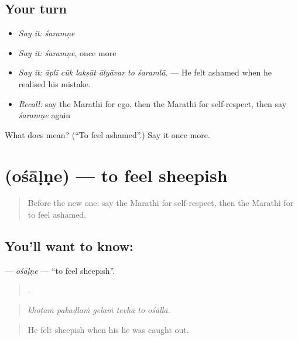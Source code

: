 \subsection*{Your turn}
\begin{itemize}
\raggedright
  \item \emph{Say it:} \emph{śaramṇe}
  \item \emph{Say it:} \emph{śaramṇe}, once more
  \item \emph{Say it:} \emph{āplī cūk lakṣāt ālyāvar to śaramlā.} — He felt ashamed when he realised his mistake.
  \item \emph{Recall:} say the Marathi for ego, then the Marathi for self-respect, then say \emph{śaramṇe} again
\end{itemize}

\begin{tcolorbox}[breakable,colback=teal!4,colframe=teal!35!black,title={Before you move on}]
What does  mean? (\textquotedblleft{}To feel ashamed\textquotedblright{}.) Say it once more.
\end{tcolorbox}
\section[\texorpdfstring{\mr{ओशाळणे} (ośāḷṇe)}{ओशाळणे (ośāḷṇe)}]{ (ośāḷṇe) — to feel sheepish}

\label{lesson:MR-C463-osalne}



\begin{quote}
Before the new one: say the Marathi for self-respect, then the Marathi for to feel ashamed.
\end{quote}

\subsection*{You'll want to know: }
\textbf{} — \emph{ośāḷṇe} — \textquotedblleft{}to feel sheepish\textquotedblright{}.

\begin{quote}
     .
\end{quote}

\begin{quote}
\emph{khoṭaṁ pakaḍlaṁ gelaṁ tevhā to ośāḷlā.}
\end{quote}

\begin{quote}
He felt sheepish when his lie was caught out.
\end{quote}

